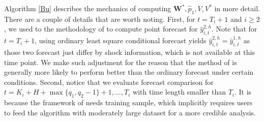 \documentclass[11pt]{article}
\def\mbf#1{\mathbf{#1}} %
\theoremstyle{definition}
\begin{document}
Algorithm \ref{Bu} describes the mechanics of computing $\mbf{W}^*, \hat{p}_1, V, V^*$ in more detail. There are a couple of details that are worth noting. First, for $t = T_i+1$ and $i \geq 2$, we used to the methodology of \cite{lin2021minimizing} to compute point forecast for $\hat{y}_{i,t}^{2,h}$. Note that for $t = T_i+1$, using ordinary least square conditional forecast yields $\hat{y}_{i,t}^{2,h}=  \hat{y}_{i,t}^{1,h}$ as those two forecast just differ by shock information, which is not available at this time point. We make such adjustment for the reason that  the method of  \cite{lin2021minimizing} is generally more likely to perform better than the ordinary forecast under certain conditions. Second, notice that we evaluate forecast comparison for $t = K_i + H+ \max\{q_1, q_2-1\} + 1, \ldots, T_i$ with time length smaller than $T_i$. It is because the framework of \cite{quaedvlieg2021multi} needs training sample, which implicitly requires users to feed the algorithm with moderately large dataset for a more credible analysis. 
\end{document}
